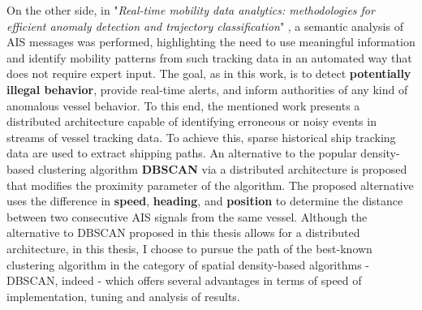 On the other side, in "\textit{Real-time mobility data analytics: methodologies for efficient anomaly detection and trajectory classification}" \cite{Real-time-ais}, a semantic analysis of AIS messages was performed, highlighting the need to use meaningful information and identify mobility patterns from such tracking data in an automated way that does not require expert input. The goal, as in this work, is to detect \textbf{potentially illegal behavior}, provide real-time alerts, and inform authorities of any kind of anomalous vessel behavior. To this end, the mentioned work presents a distributed architecture capable of identifying erroneous or noisy events in streams of vessel tracking data. To achieve this, sparse historical ship tracking data are used to extract shipping paths. An alternative to the popular density-based clustering algorithm \textbf{DBSCAN} via a distributed architecture is proposed that modifies the proximity parameter of the algorithm. The proposed alternative uses the difference in \textbf{speed}, \textbf{heading}, and \textbf{position} to determine the distance between two consecutive AIS signals from the same vessel.
Although the alternative to DBSCAN proposed in this thesis allows for a distributed architecture, in this thesis, I choose to pursue the path of the best-known clustering algorithm in the category of spatial density-based algorithms - DBSCAN, indeed - which offers several advantages in terms of speed of implementation, tuning and analysis of results.